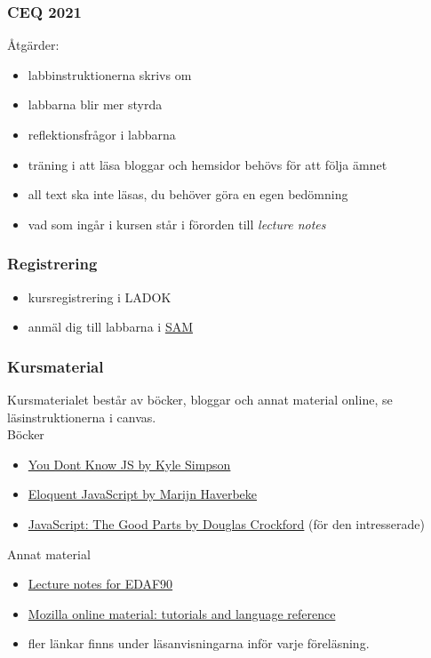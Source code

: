 \documentclass[aspectratio=1610]{beamer}
\begin{document}
\begin{frame}
  \frametitle{CEQ 2021}
Åtgärder:
\begin{itemize}
  \item labbinstruktionerna skrivs om
  \item labbarna blir mer styrda
  \item reflektionsfrågor i labbarna
  \item träning i att läsa bloggar och hemsidor behövs för att följa ämnet
  \item all text ska inte läsas, du behöver göra en egen bedömning
  \item vad som ingår i kursen står i förorden till \emph{lecture notes}
\end{itemize}
\end{frame}

\begin{frame}
  \frametitle{Registrering}
\begin{itemize}
  \item kursregistrering i LADOK
  \item anmäl dig till labbarna i \href{https://sam.cs.lth.se/Labs}{SAM}
\end{itemize}

\end{frame}

\begin{frame}
  \frametitle{Kursmaterial}

Kursmaterialet består av böcker, bloggar och annat material online, se läsinstruktionerna i canvas.
\\ \vspace{3mm}
Böcker
\begin{itemize}
\item \href{https://github.com/getify/You-Dont-Know-JS}{You Dont Know JS by Kyle Simpson} 
\item \href{https://eloquentjavascript.net/}{Eloquent JavaScript by Marijn Haverbeke}
\item \href{http://shop.oreilly.com/product/9780596517748.do}{JavaScript: The Good Parts by Douglas Crockford} (för den intresserade)
\end{itemize}

Annat material
\begin{itemize}
\item \href{http://fileadmin.cs.lth.se/cs/Education/EDAF90/lectures/lecture-notes.pdf}{Lecture notes for EDAF90}
\item \href{https://developer.mozilla.org/en-US/docs/Learn}{Mozilla online material: tutorials and language reference}
\item fler länkar finns under läsanvisningarna inför varje föreläsning.
\end{itemize}

\end{frame}

\begin{frame}[plain]
  \endpage
\end{frame}

\end{document}
